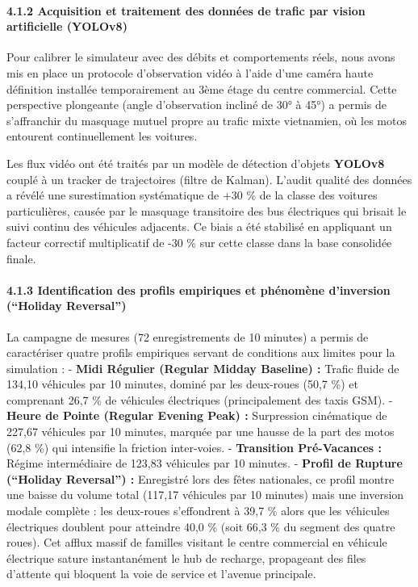 \documentclass[10pt, a4paper]{article}
\begin{document}
\paragraph{4.1.2 Acquisition et traitement des données de trafic par
vision artificielle
(YOLOv8)}\label{acquisition-et-traitement-des-donnuxe9es-de-trafic-par-vision-artificielle-yolov8}

Pour calibrer le simulateur avec des débits et comportements réels, nous
avons mis en place un protocole d'observation vidéo à l'aide d'une
caméra haute définition installée temporairement au 3ème étage du centre
commercial. Cette perspective plongeante (angle d'observation incliné de
30° à 45°) a permis de s'affranchir du masquage mutuel propre au trafic
mixte vietnamien, où les motos entourent continuellement les voitures.

Les flux vidéo ont été traités par un modèle de détection d'objets
\textbf{YOLOv8} couplé à un tracker de trajectoires (filtre de Kalman).
L'audit qualité des données a révélé une surestimation systématique de
+30 \% de la classe des voitures particulières, causée par le masquage
transitoire des bus électriques qui brisait le suivi continu des
véhicules adjacents. Ce biais a été stabilisé en appliquant un facteur
correctif multiplicatif de -30 \% sur cette classe dans la base
consolidée finale.

\paragraph{4.1.3 Identification des profils empiriques et phénomène
d'inversion (``Holiday
Reversal'')}\label{identification-des-profils-empiriques-et-phuxe9nomuxe8ne-dinversion-holiday-reversal}

La campagne de mesures (72 enregistrements de 10 minutes) a permis de
caractériser quatre profils empiriques servant de conditions aux limites
pour la simulation : - \textbf{Midi Régulier (Regular Midday Baseline)
:} Trafic fluide de 134,10 véhicules par 10 minutes, dominé par les
deux-roues (50,7 \%) et comprenant 26,7 \% de véhicules électriques
(principalement des taxis GSM). - \textbf{Heure de Pointe (Regular
Evening Peak) :} Surpression cinématique de 227,67 véhicules par 10
minutes, marquée par une hausse de la part des motos (62,8 \%) qui
intensifie la friction inter-voies. - \textbf{Transition Pré-Vacances :}
Régime intermédiaire de 123,83 véhicules par 10 minutes. -
\textbf{Profil de Rupture (``Holiday Reversal'') :} Enregistré lors des
fêtes nationales, ce profil montre une baisse du volume total (117,17
véhicules par 10 minutes) mais une inversion modale complète : les
deux-roues s'effondrent à 39,7 \% alors que les véhicules électriques
doublent pour atteindre 40,0 \% (soit 66,3 \% du segment des quatre
roues). Cet afflux massif de familles visitant le centre commercial en
véhicule électrique sature instantanément le hub de recharge, propageant
des files d'attente qui bloquent la voie de service et l'avenue
principale.
\end{document}
